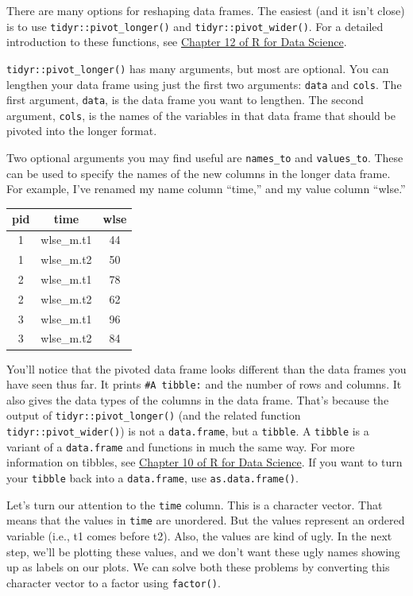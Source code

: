 \documentclass[
]{book}
\begin{document}
There are many options for reshaping data frames. The easiest (and it isn't close) is to use \texttt{tidyr::pivot\_longer()} and \texttt{tidyr::pivot\_wider()}. For a detailed introduction to these functions, see \href{https://r4ds.had.co.nz/tidy-data.html}{Chapter 12 of R for Data Science}.

\texttt{tidyr::pivot\_longer()} has many arguments, but most are optional. You can lengthen your data frame using just the first two arguments: \texttt{data} and \texttt{cols}. The first argument, \texttt{data}, is the data frame you want to lengthen. The second argument, \texttt{cols}, is the names of the variables in that data frame that should be pivoted into the longer format.

Two optional arguments you may find useful are \texttt{names\_to} and \texttt{values\_to}. These can be used to specify the names of the new columns in the longer data frame. For example, I've renamed my name column ``time,'' and my value column ``wlse.''

\begin{longtable}[]{@{}ccc@{}}
\toprule
pid & time & wlse \\
\midrule
\endhead
1 & wlse\_m.t1 & 44 \\
1 & wlse\_m.t2 & 50 \\
2 & wlse\_m.t1 & 78 \\
2 & wlse\_m.t2 & 62 \\
3 & wlse\_m.t1 & 96 \\
3 & wlse\_m.t2 & 84 \\
\bottomrule
\end{longtable}

You'll notice that the pivoted data frame looks different than the data frames you have seen thus far. It prints \texttt{\#A\ tibble:} and the number of rows and columns. It also gives the data types of the columns in the data frame. That's because the output of \texttt{tidyr::pivot\_longer()} (and the related function \texttt{tidyr::pivot\_wider()}) is not a \texttt{data.frame}, but a \texttt{tibble}. A \texttt{tibble} is a variant of a \texttt{data.frame} and functions in much the same way. For more information on tibbles, see \href{https://r4ds.had.co.nz/tibbles.html}{Chapter 10 of R for Data Science}. If you want to turn your \texttt{tibble} back into a \texttt{data.frame}, use \texttt{as.data.frame()}.

Let's turn our attention to the \texttt{time} column. This is a character vector. That means that the values in \texttt{time} are unordered. But the values represent an ordered variable (i.e., t1 comes before t2). Also, the values are kind of ugly. In the next step, we'll be plotting these values, and we don't want these ugly names showing up as labels on our plots. We can solve both these problems by converting this character vector to a factor using \texttt{factor()}.
\end{document}
